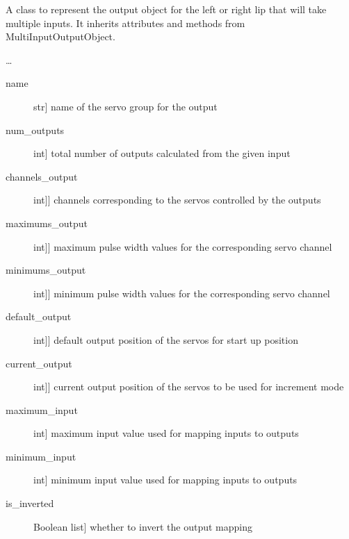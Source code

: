 \documentclass[letterpaper,10pt,english]{sphinxmanual}
\begin{document}
\begin{fulllineitems}
\label{\detokenize{specific:SideLipOutput.SideLipOutput}}
\sphinxAtStartPar
A class to represent the output object for the left or right lip that will take multiple inputs.
It inherits attributes and methods from MultiInputOutputObject.

\sphinxAtStartPar
…
\begin{description}
\item[{name}] \leavevmode{[}str{]}
\sphinxAtStartPar
name of the servo group for the output

\item[{num\_outputs}] \leavevmode{[}int{]}
\sphinxAtStartPar
total number of outputs calculated from the given input

\item[{channels\_output}] \leavevmode{[}{[}int{]}{]}
\sphinxAtStartPar
channels corresponding to the servos controlled by the outputs

\item[{maximums\_output}] \leavevmode{[}{[}int{]}{]}
\sphinxAtStartPar
maximum pulse width values for the corresponding servo channel

\item[{minimums\_output}] \leavevmode{[}{[}int{]}{]}
\sphinxAtStartPar
minimum pulse width values for the corresponding servo channel

\item[{default\_output}] \leavevmode{[}{[}int{]}{]}
\sphinxAtStartPar
default output position of the servos for start up position

\item[{current\_output}] \leavevmode{[}{[}int{]}{]}
\sphinxAtStartPar
current output position of the servos to be used for increment mode

\item[{maximum\_input}] \leavevmode{[}int{]}
\sphinxAtStartPar
maximum input value used for mapping inputs to outputs

\item[{minimum\_input}] \leavevmode{[}int{]}
\sphinxAtStartPar
minimum input value used for mapping inputs to outputs

\item[{is\_inverted}] \leavevmode{[}Boolean list{]}
\sphinxAtStartPar
whether to invert the output mapping


\end{description}
\end{fulllineitems}
\end{document}
